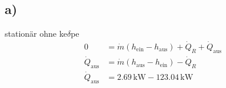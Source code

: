 

\subsection*{a)}
stationär ohne ke$\delta$pe
\begin{align*}
0 &= \dot{m} (h_{\text{ein}} - h_{\text{aus}}) + \dot{Q}_R + \dot{Q}_{\text{aus}} \\
\dot{Q}_{\text{aus}} &= \dot{m} (h_{\text{aus}} - h_{\text{ein}}) - \dot{Q}_R \\
\dot{Q}_{\text{aus}} &= 2.69 \, \text{kW} - 123.04 \, \text{kW}
\end{align*}